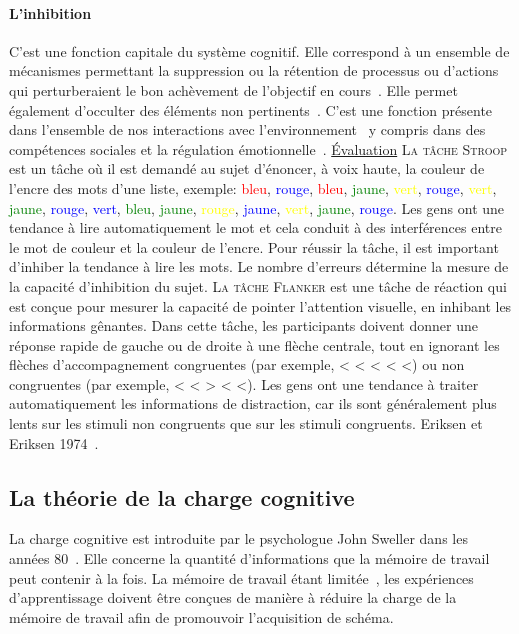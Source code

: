         \paragraph{L'inhibition}
            C'est une fonction capitale du système cognitif. Elle correspond à un ensemble de mécanismes permettant la suppression ou la rétention de processus ou d'actions qui perturberaient le bon achèvement de l'objectif en cours~. Elle permet également d'occulter des éléments non pertinents~. C'est une fonction présente dans l'ensemble de nos interactions avec l'environnement~ y compris dans des compétences sociales et la régulation émotionnelle~.
            \underline{Évaluation}
                \textsc{La tâche Stroop}
                     est un tâche où il est demandé au sujet d'énoncer, à voix haute, la couleur de l'encre des mots d'une liste, exemple: \textcolor{red}{bleu}, \textcolor{blue}{rouge}, \textcolor{red}{bleu}, \textcolor{green}{jaune}, \textcolor{yellow}{vert}, \textcolor{blue}{rouge}, \textcolor{yellow}{vert}, \textcolor{green}{jaune}, \textcolor{blue}{rouge}, \textcolor{blue}{vert}, \textcolor{green}{bleu}, \textcolor{green}{jaune}, \textcolor{yellow}{rouge}, \textcolor{blue}{jaune}, \textcolor{yellow}{vert}, \textcolor{green}{jaune}, \textcolor{blue}{rouge}. Les gens ont une tendance à lire automatiquement le mot et cela conduit à des interférences entre le mot de couleur et la couleur de l'encre. Pour réussir la tâche, il est important d'inhiber la tendance à lire les mots. Le nombre d'erreurs détermine la mesure de la capacité d'inhibition du sujet.
                \textsc{La tâche Flanker}
                    est une tâche de réaction qui est conçue pour mesurer la capacité de pointer l'attention visuelle, en inhibant les informations gênantes. Dans cette tâche, les participants doivent donner une réponse rapide de gauche ou de droite à une flèche centrale, tout en ignorant les flèches d'accompagnement congruentes (par exemple, < < < < <) ou non congruentes (par exemple, < < > < <). Les gens ont une tendance à traiter automatiquement les informations de distraction, car ils sont généralement plus lents sur les stimuli non congruents que sur les stimuli congruents. Eriksen et Eriksen 1974~.
    \subsection{La théorie de la charge cognitive}\label{sec:cog_load}
        La charge cognitive est introduite par le psychologue John Sweller dans les années 80~. Elle concerne la quantité d'informations que la mémoire de travail peut contenir à la fois. La mémoire de travail étant limitée~, les expériences d'apprentissage doivent être conçues de manière à réduire la charge de la mémoire de travail afin de promouvoir l'acquisition de schéma.
